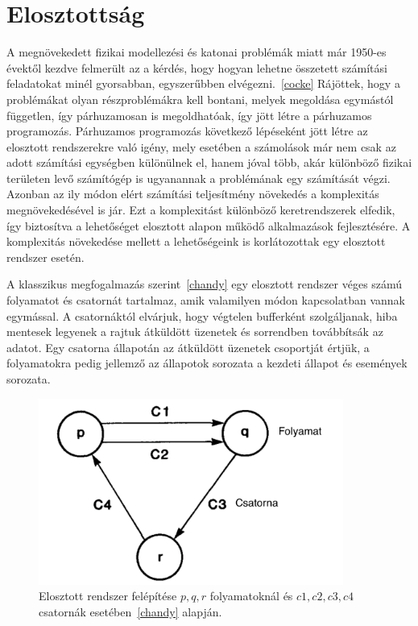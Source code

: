 \documentclass[a4paper,12pt]{article}
\begin{document}
\section{Elosztottság}
A megnövekedett fizikai modellezési és katonai problémák miatt már 1950-es évektől kezdve felmerült az a kérdés, hogy hogyan lehetne összetett számítási feladatokat minél gyorsabban, egyszerűbben elvégezni.~\ref{cocke} Rájöttek, hogy a problémákat olyan részproblémákra kell bontani, melyek megoldása egymástól független, így párhuzamosan is megoldhatóak, így jött létre a párhuzamos programozás. \linebreak
Párhuzamos programozás következő lépéseként jött létre az elosztott rendszerekre való igény, mely esetében a számolások már nem csak az adott számítási egységben különülnek el, hanem jóval több, akár különböző fizikai területen levő számítógép is ugyanannak a problémának egy számítását végzi. Azonban az ily módon elért számítási teljesítmény növekedés a komplexitás megnövekedésével is jár. Ezt a komplexitást különböző keretrendszerek elfedik, így biztosítva a lehetőséget elosztott alapon működő alkalmazások fejlesztésére. A komplexitás növekedése mellett a lehetőségeink is korlátozottak egy elosztott rendszer esetén. \linebreak

A klasszikus megfogalmazás szerint~\ref{chandy} egy elosztott rendszer véges számú folyamatot és csatornát tartalmaz, amik valamilyen módon kapcsolatban vannak egymással. A csatornáktól elvárjuk, hogy végtelen bufferként szolgáljanak, hiba mentesek legyenek a rajtuk átküldött üzenetek és sorrendben továbbítsák az adatot. Egy csatorna állapotán az átküldött üzenetek csoportját értjük, a folyamatokra pedig jellemző az állapotok sorozata a kezdeti állapot és események sorozata.

\begin{figure}[H]
\centering
\includegraphics[width=100mm]{img/distSys.png}
\caption{Elosztott rendszer felépítése $p, q, r$ folyamatoknál és $c1, c2, c3, c4$ csatornák esetében~\ref{chandy} alapján.
\label{distSys}}
\end{figure}
\end{document}

